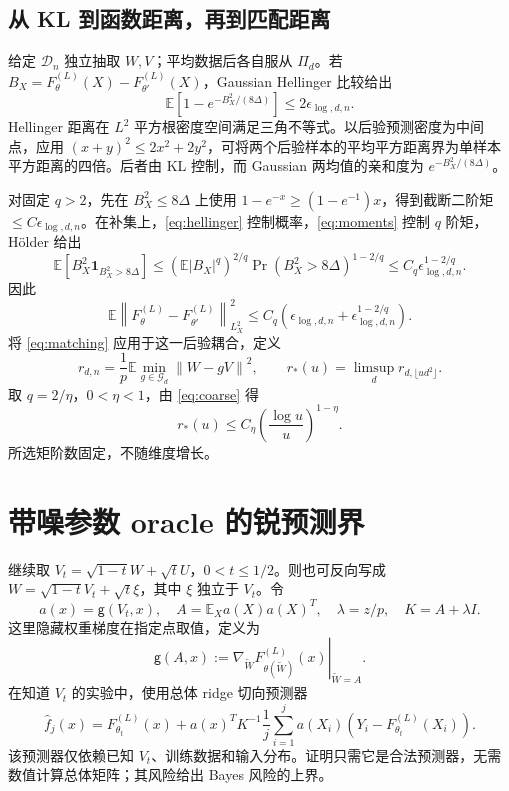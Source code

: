\documentclass[a4paper]{tufte-handout}
\newcommand{\E}{\mathbb E}
\newcommand{\norm}[1]{\left\|#1\right\|}
\begin{document}
\begin{fullwidth}
\subsection{从 KL 到函数距离，再到匹配距离}
给定 $\mathcal D_n$ 独立抽取 $W,V$；平均数据后各自服从 $\Pi_d$。若 $B_X=F_\theta^{(L)}(X)-F_{\theta'}^{(L)}(X)$，Gaussian Hellinger 比较给出
\begin{equation}\label{eq:hellinger}
\E[1-e^{-B_X^2/(8\Delta)}]\le2\epsilon_{\log,d,n}.
\end{equation}
Hellinger 距离在 $L^2$ 平方根密度空间满足三角不等式。以后验预测密度为中间点，应用 $(x+y)^2\le2x^2+2y^2$，可将两个后验样本的平均平方距离界为单样本平方距离的四倍。后者由 KL 控制，而 Gaussian 两均值的亲和度为 $e^{-B_X^2/(8\Delta)}$。

对固定 $q>2$，先在 $B_X^2\le8\Delta$ 上使用
$1-e^{-x}\ge(1-e^{-1})x$，得到截断二阶矩 $\le C\epsilon_{\log,d,n}$。在补集上，\eqref{eq:hellinger} 控制概率，\eqref{eq:moments} 控制 $q$ 阶矩，Hölder 给出
\[
\E[B_X^2\boldsymbol1_{B_X^2>8\Delta}]
\le(\E|B_X|^q)^{2/q}\Pr(B_X^2>8\Delta)^{1-2/q}
\le C_q\epsilon_{\log,d,n}^{1-2/q}.
\]
因此
\[
\E\norm{F_\theta^{(L)}-F_{\theta'}^{(L)}}_{L_X^2}^2
\le C_q(\epsilon_{\log,d,n}+\epsilon_{\log,d,n}^{1-2/q}).
\]
将 \eqref{eq:matching} 应用于这一后验耦合，定义
\[
r_{d,n}=\frac1p\E\min_{g\in\mathcal G_d}\norm{W-gV}^2,
\qquad r_*(u)=\limsup_d r_{d,\lfloor ud^2\rfloor}.
\]
取 $q=2/\eta$，$0<\eta<1$，由 \eqref{eq:coarse} 得
\begin{equation}\label{eq:rate}
r_*(u)\le C_\eta\left(\frac{\log u}{u}\right)^{1-\eta}.
\end{equation}
所选矩阶数固定，不随维度增长。

\section{带噪参数 oracle 的锐预测界}
继续取 $V_t=\sqrt{1-t}W+\sqrt tU$，$0<t\le1/2$。则也可反向写成
$W=\sqrt{1-t}V_t+\sqrt t\xi$，其中 $\xi$ 独立于 $V_t$。令
\[
a(x)=\mathsf g(V_t,x),\quad A=\E_Xa(X)a(X)^T,
\quad\lambda=z/p,\quad K=A+\lambda I.
\]
这里隐藏权重梯度在指定点取值，定义为
\[
\mathsf g(A,x):=\left.\nabla_{\widetilde W}
F_{\theta(\widetilde W)}^{(L)}(x)\right|_{\widetilde W=A}.
\]
在知道 $V_t$ 的实验中，使用总体 ridge 切向预测器
\begin{equation}\label{eq:estimator}
\widehat f_j(x)=F_{\theta_t}^{(L)}(x)+a(x)^TK^{-1}
\frac1j\sum_{i=1}^j a(X_i)(Y_i-F_{\theta_t}^{(L)}(X_i)).
\end{equation}
该预测器仅依赖已知 $V_t$、训练数据和输入分布。证明只需它是合法预测器，无需数值计算总体矩阵；其风险给出 Bayes 风险的上界。


\end{fullwidth}
\end{document}
